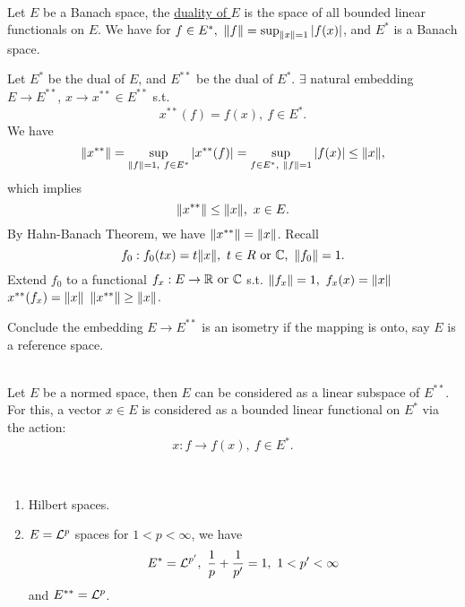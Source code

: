 \begin{definition}\ \\
    Let $E$ be a Banach space, the \underline{duality of $E$} is the space of all bounded linear functionals on $E$. We have for $f \in E^*,\ \norm{f} = \sup_{\norm{x} = 1} \abs{f(x)}$, and $E^*$ is a Banach space.  
\end{definition}

\np Let $E^*$ be the dual of $E$, and $E^{**}$ be the dual of $E^*$. $\exists$ natural embedding $E \to E^{**}$, $x \to x^{**} \in E^{**}$ s.t.
\begin{equation*}
    x^{**}(f) = f(x),\ f \in E^*.
\end{equation*}
We have
\begin{equation*}
    \norm{x^{**}} = \sup_{\norm{f} = 1,\ f \in E^*} \abs{x^{**} (f)} = \sup_{f \in E^*,\ \norm{f} = 1} \abs{f(x)} \leq \norm{x},
\end{equation*}
which implies
\begin{equation*}
    \norm{x^{**}} \leq \norm{x},\ x \in E.
\end{equation*}
By Hahn-Banach Theorem, we have $\norm{x^{**}} = \norm{x}$. Recall 
\begin{equation*}
    f_0: f_0(tx) = t \norm{x},\ t \in R \text{ or } \mathbb{C},\ \norm{f_0} = 1.
\end{equation*}
Extend $f_0$ to a functional $f_x: E \to \mathbb{R} \text{ or } \mathbb{C}$ s.t. $\norm{f_x} = 1,\ f_x(x) = \norm{x}$ \imply $x^{**}(f_x) = \norm{x}$ \imply $\norm{x^{**}} \geq \norm{x}$.

\np Conclude the embedding $E \to E^{**}$ is an isometry if the mapping is onto, say $E$ is a reference space.

\vspace{6pt}
\begin{theorem}\ \\
Let $E$ be a normed space, then $E$ can be considered as a linear subspace of $E^{**}$. For this, a vector $x \in E$ is considered as a bounded linear functional on $E^*$ via the action:
\begin{equation*}
    x: f \to f(x),\ f \in E^*.
\end{equation*}
\end{theorem}


\begin{examples}\ 
\begin{enumerate}[label = (\alph*)]
    \item Hilbert spaces.
    \item $E = \mathcal{L}^p$ spaces for $1 < p < \infty$, we have
    \begin{equation*}
        E^* = \mathcal{L}^{p'},\ \frac{1}{p} + \frac{1}{p'} = 1,\ 1 < p' < \infty
    \end{equation*}
    and $E^{**} = \mathcal{L}^p$.
\end{enumerate}
\end{examples}


